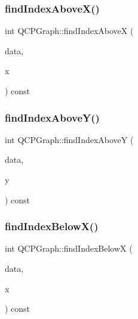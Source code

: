 \subsubsection{\texorpdfstring{find\+Index\+Above\+X()}{findIndexAboveX()}}
{\footnotesize\ttfamily int Q\+C\+P\+Graph\+::find\+Index\+AboveX (\begin{DoxyParamCaption}\item[{const Q\+Vector$<$ Q\+PointF $>$ $\ast$}]{data,  }\item[{double}]{x }\end{DoxyParamCaption}) const\hspace{0.3cm}{\ttfamily [protected]}}

\mbox{\label{class_q_c_p_graph_a8b952a5f937840dc242489585cc8000d}} 
\subsubsection{\texorpdfstring{find\+Index\+Above\+Y()}{findIndexAboveY()}}
{\footnotesize\ttfamily int Q\+C\+P\+Graph\+::find\+Index\+AboveY (\begin{DoxyParamCaption}\item[{const Q\+Vector$<$ Q\+PointF $>$ $\ast$}]{data,  }\item[{double}]{y }\end{DoxyParamCaption}) const\hspace{0.3cm}{\ttfamily [protected]}}

\mbox{\label{class_q_c_p_graph_a8c3f15dd5a06633011a6ef36016d308b}} 
\subsubsection{\texorpdfstring{find\+Index\+Below\+X()}{findIndexBelowX()}}
{\footnotesize\ttfamily int Q\+C\+P\+Graph\+::find\+Index\+BelowX (\begin{DoxyParamCaption}\item[{const Q\+Vector$<$ Q\+PointF $>$ $\ast$}]{data,  }\item[{double}]{x }\end{DoxyParamCaption}) const\hspace{0.3cm}{\ttfamily [protected]}}


